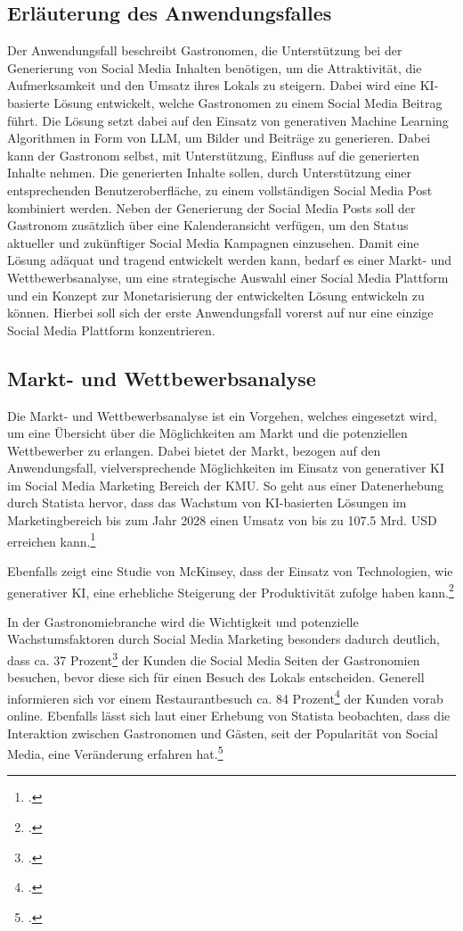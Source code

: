 \subsection{Erläuterung des Anwendungsfalles}
Der Anwendungsfall beschreibt Gastronomen, die Unterstützung bei der Generierung von Social Media Inhalten benötigen, um die Attraktivität, die Aufmerksamkeit und den Umsatz ihres Lokals zu steigern.
Dabei wird eine \ac{KI}-basierte Lösung entwickelt, welche Gastronomen zu einem Social Media Beitrag führt.
Die Lösung setzt dabei auf den Einsatz von generativen Machine Learning Algorithmen in Form von \ac{LLM}, um Bilder und Beiträge zu generieren.
Dabei kann der Gastronom selbst, mit Unterstützung, Einfluss auf die generierten Inhalte nehmen.
Die generierten Inhalte sollen, durch Unterstützung einer entsprechenden Benutzeroberfläche, zu einem vollständigen Social Media Post kombiniert werden.
Neben der Generierung der Social Media Posts soll der Gastronom zusätzlich über eine Kalenderansicht verfügen, um den Status aktueller und zukünftiger Social Media Kampagnen einzusehen.
Damit eine Lösung adäquat und tragend entwickelt werden kann, bedarf es einer Markt- und Wettbewerbsanalyse, um eine strategische Auswahl einer Social Media Plattform und ein Konzept zur Monetarisierung der entwickelten Lösung entwickeln zu können.
Hierbei soll sich der erste Anwendungsfall vorerst auf nur eine einzige Social Media Plattform konzentrieren.

\subsection{Markt- und Wettbewerbsanalyse}
Die Markt- und Wettbewerbsanalyse ist ein Vorgehen, welches eingesetzt wird, um eine Übersicht über die Möglichkeiten am Markt und die potenziellen Wettbewerber zu erlangen.
Dabei bietet der Markt, bezogen auf den Anwendungsfall, vielversprechende Möglichkeiten im Einsatz von generativer \ac{KI} im Social Media Marketing Bereich der \ac{KMU}.
So geht aus einer Datenerhebung durch Statista hervor, dass das Wachstum von \ac{KI}-basierten Lösungen im Marketingbereich bis zum Jahr 2028 einen Umsatz von bis zu 107.5 Mrd. \ac{USD} erreichen kann.\footcite{statista_ai_marketing_europe}

Ebenfalls zeigt eine Studie von McKinsey, dass der Einsatz von Technologien, wie generativer \ac{KI}, eine erhebliche Steigerung der Produktivität zufolge haben kann.\footcite{mckinsey_genai_marketing}

In der Gastronomiebranche wird die Wichtigkeit und potenzielle Wachstumsfaktoren durch Social Media Marketing besonders dadurch deutlich, dass ca. 37 Prozent\footcite{apicbase_gastro_fakten} der Kunden die Social Media Seiten der Gastronomien besuchen, bevor diese sich für einen Besuch des Lokals entscheiden.
Generell informieren sich vor einem Restaurantbesuch ca. 84 Prozent\footcite{g_wie_gastro_trends_2024} der Kunden vorab online.
Ebenfalls lässt sich laut einer Erhebung von Statista beobachten, dass die Interaktion zwischen Gastronomen und Gästen, seit der Popularität von Social Media, eine Veränderung erfahren hat.\footcite{statista_social_media_gastgewerbe}

